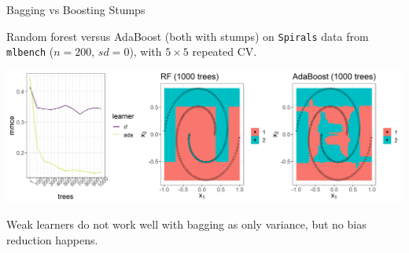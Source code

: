 
\begin{vbframe}{Bagging vs Boosting Stumps}

Random forest versus AdaBoost (both with stumps) on \texttt{Spirals} data from 
\texttt{mlbench} ($n=200$, $sd=0$), with $5 \times 5$ repeated CV.


\vfill

\includegraphics[width=\textwidth]{figure/stump_plots.png}

\vfill

Weak learners do not work well with bagging as only variance, but no bias reduction happens.

\end{vbframe}


